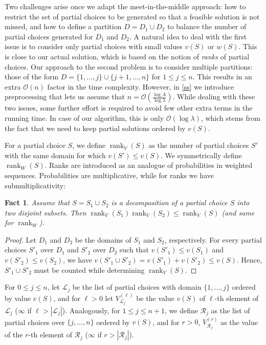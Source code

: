 \documentclass{article}
\theoremstyle{plain}
\newtheorem{fact}[theorem]{Fact}
\theoremstyle{definition}
\newcommand{\Oh}{\mathcal{O}}
\renewcommand{\L}{\mathcal{L}}
\newcommand{\R}{\mathcal{R}}
\DeclareMathOperator*{\rank}{rank}
\begin{document}
  Two challenges arise once we adapt the meet-in-the-middle approach:
  how to restrict the set of partial choices to be generated so that a feasible solution is not missed,
  and how to define a partition $D=D_1\cup D_2$ to balance the number of partial choices generated for $D_1$ and $D_2$.
  A natural idea to deal with the first issue is to consider only partial choices with small values $v(S)$ or $w(S)$.
  This is close to our actual solution, which is based on the notion of \emph{ranks} of partial choices.
  Our approach to the second problem is to consider multiple partitions: those of the form $D=\{1,\ldots,j\}\cup\{j+1,\ldots,n\}$ for $1\le j \le n$.
  This results in an extra $\Oh(n)$ factor in the time complexity.
  However, in \cref{ss} we introduce preprocessing that lets us assume that $n=\Oh(\frac{\log A}{\log \lambda})$.
  While dealing with these two issues, some further effort is required to avoid few other extra terms in the running time.
  In case of our algorithm, this is only $\Oh(\log \lambda)$, which stems from the fact that we need to keep partial solutions ordered by $v(S)$. 
  
  
    For a partial choice $S$, we define $\rank_V(S)$ as the number of partial choices $S'$ with the same domain for which $v(S')\le v(S)$. 
    We symmetrically define $\rank_W(S)$.
    Ranks are introduced as an analogue of probabilities in weighted sequences.
    Probabilities are multiplicative, while for ranks we have submultiplicativity:
      
    \begin{fact}\label{fct:comb}
      Assume that $S=S_1\cup S_2$ is a decomposition of a partial choice $S$ into two disjoint subsets.
      Then $\rank_V(S_1)\rank_V(S_2)\le \rank_V(S)$ (and same for $\rank_W$).
    \end{fact}
    \begin{proof}
      Let $D_1$ and $D_2$ be the domains of $S_1$ and $S_2$, respectively.
      For every partial choices $S'_1$ over $D_1$ and $S'_2$ over $D_2$ such that $v(S'_1) \le v(S_1)$ and $v(S'_2) \le v(S_2)$, we have
      $v(S'_1 \cup S'_2)=v(S'_1)+v(S'_2)\le v(S)$.
      Hence, $S'_1\cup S'_2$ must be counted while determining $\rank_V(S)$.
    \end{proof}
  
  
      
   For $0\le j \le n$, let $\L_j$ be the list of partial choices with domain $\{1,\ldots,j\}$ ordered by value $v(S)$,
   and for $\ell>0$ let $V^{(\ell)}_{\L_j}$ be the value $v(S)$ of $\ell$-th element of $\L_j$ ($\infty$ if $\ell>|\L_j|$).
  Analogously, for $1\le j \le n+1$, we define $\R_j$ as the list of partial choices over $\{j,\ldots,n\}$ ordered by $v(S)$,
  and for $r>0$, $V^{(r)}_{\R_j}$ as the value of the $r$-th element of $\R_j$ ($\infty$ if $r>|\R_j|$).
  
\end{document}
